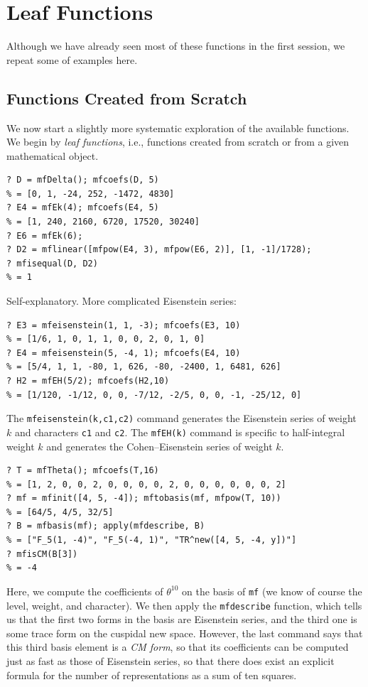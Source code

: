 \documentclass[11pt]{article}
\renewcommand{\th}{\theta}
\def\kbd#1{{\tt #1}}
\begin{document}
\section{Leaf Functions}

Although we have already seen most of these functions in the first session,
we repeat some of examples here.

\subsection{Functions Created from Scratch}

We now start a slightly more systematic exploration of the available functions.
We begin by \emph{leaf functions}, i.e., functions created from scratch or
from a given mathematical object.

\begin{verbatim}
? D = mfDelta(); mfcoefs(D, 5)
% = [0, 1, -24, 252, -1472, 4830]
? E4 = mfEk(4); mfcoefs(E4, 5)
% = [1, 240, 2160, 6720, 17520, 30240]
? E6 = mfEk(6);
? D2 = mflinear([mfpow(E4, 3), mfpow(E6, 2)], [1, -1]/1728);
? mfisequal(D, D2)
% = 1
\end{verbatim}

  Self-explanatory. More complicated Eisenstein series:

\begin{verbatim}
? E3 = mfeisenstein(1, 1, -3); mfcoefs(E3, 10)
% = [1/6, 1, 0, 1, 1, 0, 0, 2, 0, 1, 0]
? E4 = mfeisenstein(5, -4, 1); mfcoefs(E4, 10)
% = [5/4, 1, 1, -80, 1, 626, -80, -2400, 1, 6481, 626]
? H2 = mfEH(5/2); mfcoefs(H2,10)
% = [1/120, -1/12, 0, 0, -7/12, -2/5, 0, 0, -1, -25/12, 0]
\end{verbatim}

The \kbd{mfeisenstein(k,c1,c2)} command generates the Eisenstein series of weight
$k$ and characters \kbd{c1} and \kbd{c2}. The \kbd{mfEH(k)} command is specific
to half-integral weight $k$ and generates the Cohen--Eisenstein series of
weight $k$.

\begin{verbatim}
? T = mfTheta(); mfcoefs(T,16)
% = [1, 2, 0, 0, 2, 0, 0, 0, 0, 2, 0, 0, 0, 0, 0, 0, 2]
? mf = mfinit([4, 5, -4]); mftobasis(mf, mfpow(T, 10))
% = [64/5, 4/5, 32/5]
? B = mfbasis(mf); apply(mfdescribe, B)
% = ["F_5(1, -4)", "F_5(-4, 1)", "TR^new([4, 5, -4, y])"]
? mfisCM(B[3])
% = -4
\end{verbatim}

  Here, we compute the coefficients of $\th^{10}$ on the basis of \kbd{mf}
  (we know of course the level, weight, and character). We then apply
  the \kbd{mfdescribe} function, which tells us that the first two forms in
  the basis are Eisenstein series, and the third one is some trace form
  on the cuspidal new space. However, the last command says that this third
  basis element is a \emph{CM form}, so that its coefficients can be computed
  just as fast as those of Eisenstein series, so that there does exist
  an explicit formula for the number of representations as a sum of ten
  squares.
\end{document}
